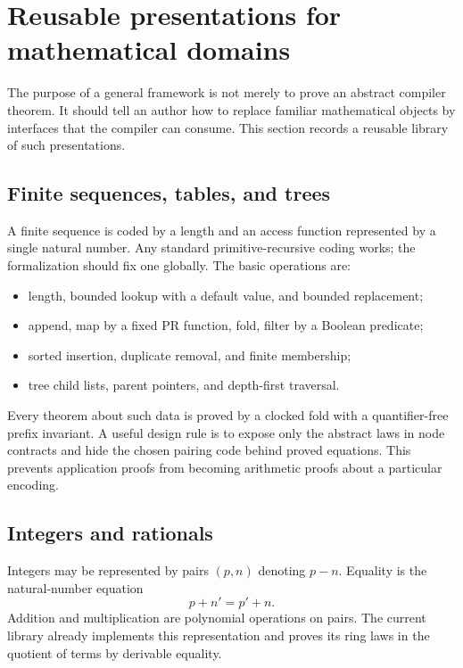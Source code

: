 \section{Reusable presentations for mathematical domains}

The purpose of a general framework is not merely to prove an abstract compiler
theorem.  It should tell an author how to replace familiar mathematical objects
by interfaces that the compiler can consume.  This section records a reusable
library of such presentations.

\subsection{Finite sequences, tables, and trees}

A finite sequence is coded by a length and an access function represented by a
single natural number.  Any standard primitive-recursive coding works; the
formalization should fix one globally.  The basic operations are:

\begin{itemize}
\item length, bounded lookup with a default value, and bounded replacement;
\item append, map by a fixed PR function, fold, filter by a Boolean predicate;
\item sorted insertion, duplicate removal, and finite membership;
\item tree child lists, parent pointers, and depth-first traversal.
\end{itemize}

Every theorem about such data is proved by a clocked fold with a quantifier-free
prefix invariant.  A useful design rule is to expose only the abstract laws in
node contracts and hide the chosen pairing code behind proved equations.  This
prevents application proofs from becoming arithmetic proofs about a particular
encoding.

\subsection{Integers and rationals}

Integers may be represented by pairs \((p,n)\) denoting \(p-n\).  Equality is
the natural-number equation
\[
        p+n'=p'+n.
\]
Addition and multiplication are polynomial operations on pairs.  The current
 library already implements this representation and
proves its ring laws in the quotient of terms by derivable equality.

